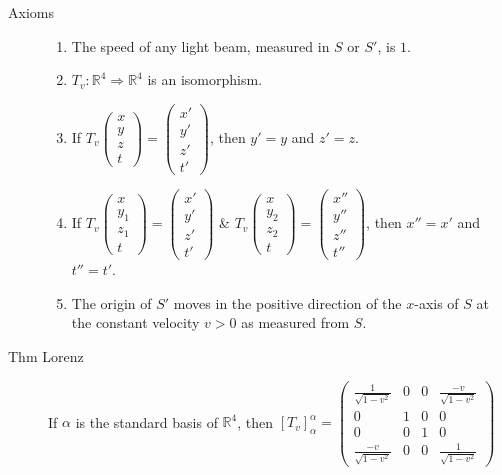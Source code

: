 \documentclass[9pt, twocolumn]{extarticle}
\newcommand{\realnum}{\mathbb{R}}
\begin{document}
\begin{description}
    \item[Axioms] \begin{enumerate}[label=A\arabic*.]
                \item The speed of any light beam,  measured in $S$ or $S'$, is $1$.
                \item $T_v: \realnum^4 \Rightarrow \realnum^4$ is an isomorphism.
                \item If $T_v \begin{pmatrix}x \\ y \\ z \\ t\end{pmatrix} = \begin{pmatrix}x' \\ y' \\ z' \\ t'\end{pmatrix}$, then $y' = y$ and $z' = z$.
                \item If $T_v \begin{pmatrix}x \\ y_1 \\ z_1 \\ t\end{pmatrix} = \begin{pmatrix}x' \\ y' \\ z' \\ t'\end{pmatrix}$ \& $T_v \begin{pmatrix}x \\ y_2 \\ z_2 \\ t\end{pmatrix} = \begin{pmatrix}x'' \\ y'' \\ z'' \\ t''\end{pmatrix}$, then $x'' = x'$ and $t'' = t'$.
                \item The origin of $S'$ moves in the positive direction of the $x$-axis of $S$ at the constant velocity $v > 0$ as measured from $S$.
    \end{enumerate}
    \item[Thm Lorenz] If $\alpha$ is the standard basis of $\realnum^4$, then $[T_v]^\alpha_\alpha = \begin{pmatrix}\frac{1}{\sqrt{1-v^2}} & 0 & 0 & \frac{-v}{\sqrt{1-v^2}}\\ 0 & 1 & 0 & 0 \\ 0 & 0 & 1 & 0 \\ \frac{-v}{\sqrt{1-v^2}} & 0 & 0 & \frac{1}{\sqrt{1-v^2}}\end{pmatrix}$

\end{description}
\end{document}
